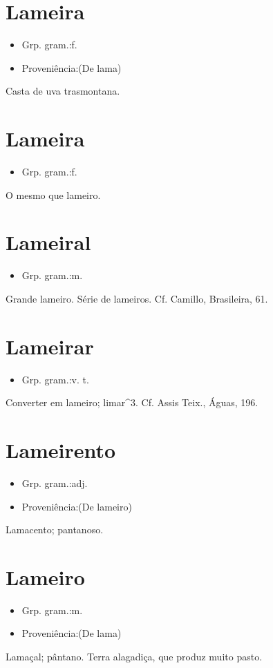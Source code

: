 \section{Lameira}
\begin{itemize}
\item {Grp. gram.:f.}
\end{itemize}
\begin{itemize}
\item {Proveniência:(De \textunderscore lama\textunderscore )}
\end{itemize}
Casta de uva trasmontana.
\section{Lameira}
\begin{itemize}
\item {Grp. gram.:f.}
\end{itemize}
O mesmo que \textunderscore lameiro\textunderscore .
\section{Lameiral}
\begin{itemize}
\item {Grp. gram.:m.}
\end{itemize}
Grande lameiro.
Série de lameiros. Cf. Camillo, \textunderscore Brasileira\textunderscore , 61.
\section{Lameirar}
\begin{itemize}
\item {Grp. gram.:v. t.}
\end{itemize}
Converter em lameiro; \textunderscore limar\textunderscore ^3. Cf. Assis Teix., \textunderscore Águas\textunderscore , 196.
\section{Lameirento}
\begin{itemize}
\item {Grp. gram.:adj.}
\end{itemize}
\begin{itemize}
\item {Proveniência:(De \textunderscore lameiro\textunderscore )}
\end{itemize}
Lamacento; pantanoso.
\section{Lameiro}
\begin{itemize}
\item {Grp. gram.:m.}
\end{itemize}
\begin{itemize}
\item {Proveniência:(De \textunderscore lama\textunderscore )}
\end{itemize}
Lamaçal; pântano.
Terra alagadiça, que produz muito pasto.
